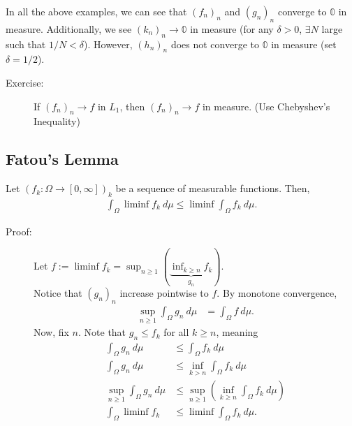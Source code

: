 \documentclass[9pt]{extarticle}
\begin{document}
  In all the above examples, we can see that $(f_n)_n$ and $(g_n)_n$ converge to $\mathbb{0}$ in measure. Additionally, we see $(k_n)_n \rightarrow \mathbb{0}$ in measure (for any $\delta > 0$, $\exists N$ large such that $1/N < \delta$). However, $(h_n)_n$ does not converge to $\mathbb{0}$ in measure (set $\delta = 1/2$).
  \begin{description}
    \item[Exercise:] If $(f_n)_n\rightarrow f$ in $L_1$, then $(f_n)_n \rightarrow f$ in measure. (Use Chebyshev's Inequality)
  \end{description}
  \subsection{Fatou's Lemma}%
  Let $\left(f_k: \Omega \rightarrow [0,\infty]\right)_k$ be a sequence of measurable functions. Then,
  \begin{align*}
    \int_{\Omega}\liminf f_k~d\mu \leq \liminf\int_{\Omega}f_k~d\mu.
  \end{align*}
  \begin{description}
    \item[Proof:] Let $\displaystyle f:= \liminf f_k = \sup_{n\geq 1}\left(\underbrace{\inf_{k\geq n}f_k}_{g_n}\right)$.\\

      Notice that $(g_n)_n$ increase pointwise to $f$. By monotone convergence,
      \begin{align*}
        \sup_{n\geq 1}\int_{\Omega}g_n~d\mu &= \int_{\Omega}f~d\mu.
      \end{align*}
      Now, fix $n$. Note that $g_n \leq f_k$ for all $k\geq n$, meaning
      \begin{align*}
        \int_{\Omega}g_n~d\mu &\leq \int_{\Omega}f_k~d\mu\\
        \int_{\Omega}g_n~d\mu &\leq \inf_{k > n}\int_{\Omega}f_k~d\mu\\
        \sup_{n\geq 1}\int_{\Omega}g_n~d\mu &\leq \sup_{n\geq 1}\left(\inf_{k\geq n}\int_{\Omega}f_k~d\mu\right)\\
        \int_{\Omega}\liminf f_k &\leq \liminf \int_{\Omega}f_k~d\mu.
      \end{align*}
  \end{description}
\end{document}
